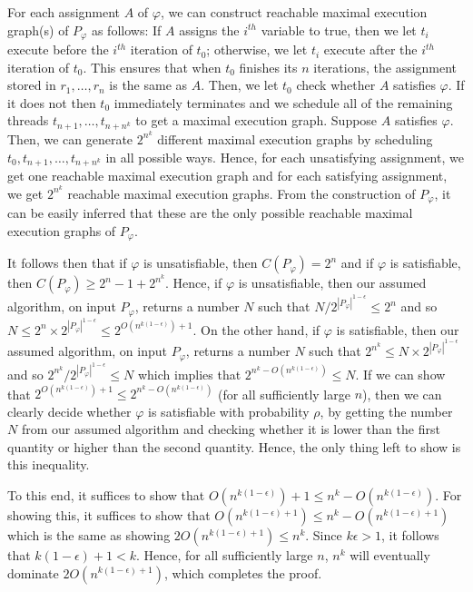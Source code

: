 \documentclass[acmsmall]{acmart}
\begin{document}
For each assignment $A$ of $\varphi$, we can construct reachable maximal execution graph(s) of $P_\varphi$ as follows: If $A$ assigns the $i^{th}$ variable to true, then we let $t_i$
execute before the $i^{th}$ iteration of $t_0$; otherwise, we let $t_i$ execute after
the $i^{th}$ iteration of $t_0$. This ensures that when $t_0$ finishes its $n$ iterations,
the assignment stored in $r_1,\dots,r_n$ is the same as $A$. Then, we let
$t_0$ check whether $A$ satisfies $\varphi$. If it does not then $t_0$ immediately terminates and we schedule all of the remaining threads $t_{n+1},\dots,t_{n+n^k}$
to get a maximal execution graph. Suppose $A$ satisfies $\varphi$. Then, we can generate $2^{n^k}$ different maximal execution graphs by scheduling $t_0,t_{n+1},\dots,t_{n+n^k}$ in all possible ways.
Hence, for each unsatisfying assignment, we get one reachable maximal execution graph
and for each satisfying assignment, we get $2^{n^k}$ reachable maximal execution graphs.
From the construction of $P_\varphi$, it can be easily inferred that these are the only possible reachable maximal execution graphs of $P_\varphi$.


It follows then that if $\varphi$ is unsatisfiable, then $C(P_\varphi) = 2^n$
and if $\varphi$ is satisfiable, then $C(P_\varphi) \ge 2^n - 1 + 2^{n^k}$.
Hence, if $\varphi$ is unsatisfiable, then our assumed algorithm, on input $P_\varphi$, returns a number $N$ such that $N/2^{|P_\varphi|^{1-\epsilon}} \le 2^n$ and so $N \le 2^n \times 2^{|P_\varphi|^{1-\epsilon}} \le
2^{O(n^{k(1-\epsilon)}) + 1}$. On the other hand, if $\varphi$ is satisfiable,
then our assumed algorithm, on input $P_\varphi$,
returns a number $N$ such that $2^{n^k} \le N \times 2^{|P_\varphi|^{1-\epsilon}}$
and so $2^{n^k}/2^{|P_\varphi|^{1-\epsilon}} \le N$ which implies that
$2^{n^k-O(n^{k(1-\epsilon)})} \le N$.
If we can show that $2^{O(n^{k(1-\epsilon)}) + 1} \le 2^{n^k-O(n^{k(1-\epsilon)})}$ (for all sufficiently large $n$), then we can clearly decide whether $\varphi$ is satisfiable
with probability $\rho$, by getting the number $N$ from our assumed algorithm and checking whether it is lower than the first quantity
or higher than the second quantity. Hence, the only thing left to show is this inequality.

To this end, it suffices to show that $O(n^{k(1-\epsilon)}) + 1 \le n^k-O(n^{k(1-\epsilon)})$. For showing this, it suffices to show that $O(n^{k(1-\epsilon)+1}) \le n^k - O(n^{k(1-\epsilon)+1})$ which is the same as showing
$2O(n^{k(1-\epsilon)+1}) \le n^k$. Since $k\epsilon > 1$,
it follows that $k(1-\epsilon) + 1 < k$. Hence, for all sufficiently large $n$,
$n^k$ will eventually dominate $2O(n^{k(1-\epsilon)+1})$, which completes the proof.
\end{document}
